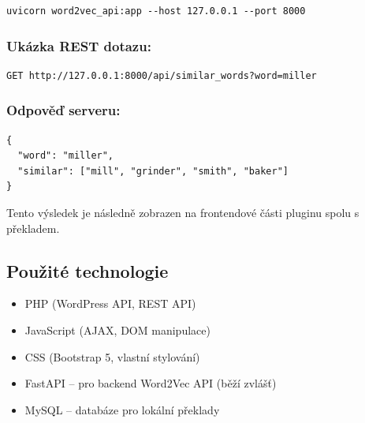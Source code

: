 \documentclass[czech, ba, kiv, he]{fasthesis}
\begin{document}
\begin{verbatim}
uvicorn word2vec_api:app --host 127.0.0.1 --port 8000
\end{verbatim}

\subsubsection*{Ukázka REST dotazu:}

\begin{verbatim}
GET http://127.0.0.1:8000/api/similar_words?word=miller
\end{verbatim}

\subsubsection*{Odpověď serveru:}

\begin{verbatim}
{
  "word": "miller",
  "similar": ["mill", "grinder", "smith", "baker"]
}
\end{verbatim}

Tento výsledek je následně zobrazen na frontendové části pluginu spolu s překladem.



\subsection*{Použité technologie}

\begin{itemize}
    \item PHP (WordPress API, REST API)
    \item JavaScript (AJAX, DOM manipulace)
    \item CSS (Bootstrap 5, vlastní stylování)
    \item FastAPI – pro backend Word2Vec API (běží zvlášť)
    \item MySQL – databáze pro lokální překlady
\end{itemize}
\end{document}

